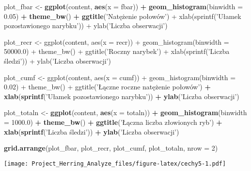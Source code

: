 \documentclass[]{article}
\newenvironment{Shaded}{\begin{snugshade}}{\end{snugshade}}
\newcommand{\DataTypeTok}[1]{\textcolor[rgb]{0.13,0.29,0.53}{#1}}
\newcommand{\DecValTok}[1]{\textcolor[rgb]{0.00,0.00,0.81}{#1}}
\newcommand{\FloatTok}[1]{\textcolor[rgb]{0.00,0.00,0.81}{#1}}
\newcommand{\KeywordTok}[1]{\textcolor[rgb]{0.13,0.29,0.53}{\textbf{#1}}}
\newcommand{\NormalTok}[1]{#1}
\newcommand{\OperatorTok}[1]{\textcolor[rgb]{0.81,0.36,0.00}{\textbf{#1}}}
\newcommand{\StringTok}[1]{\textcolor[rgb]{0.31,0.60,0.02}{#1}}
\begin{document}
\begin{Shaded}
\begin{Highlighting}[]
\NormalTok{plot_fbar <-}\StringTok{ }\KeywordTok{ggplot}\NormalTok{(content, }\KeywordTok{aes}\NormalTok{(}\DataTypeTok{x =}\NormalTok{ fbar)) }\OperatorTok{+}\StringTok{ }\KeywordTok{geom_histogram}\NormalTok{(}\DataTypeTok{binwidth =} \FloatTok{0.05}\NormalTok{) }\OperatorTok{+}
\StringTok{  }\KeywordTok{theme_bw}\NormalTok{() }\OperatorTok{+}\StringTok{ }\KeywordTok{ggtitle}\NormalTok{(}\StringTok{'Natężenie połowów') + }
\StringTok{  xlab(sprintf('}\NormalTok{Ułamek pozostawionego narybku}\StringTok{')) + ylab('}\NormalTok{Liczba obserwacji}\StringTok{')}

\StringTok{plot_recr <- ggplot(content, aes(x = recr)) + geom_histogram(binwidth = 50000.0) +}
\StringTok{  theme_bw() + ggtitle('}\NormalTok{Roczny narybek}\StringTok{') + }
\StringTok{  xlab(sprintf('}\NormalTok{Liczba śledzi}\StringTok{')) + ylab('}\NormalTok{Liczba obserwacji}\StringTok{')}

\StringTok{plot_cumf <- ggplot(content, aes(x = cumf)) + geom_histogram(binwidth = 0.02) +}
\StringTok{  theme_bw() + ggtitle('}\NormalTok{Łączne roczne natężenie połowów') }\OperatorTok{+}\StringTok{ }
\StringTok{  }\KeywordTok{xlab}\NormalTok{(}\KeywordTok{sprintf}\NormalTok{(}\StringTok{'Ułamek pozostawionego narybku'}\NormalTok{)) }\OperatorTok{+}\StringTok{ }\KeywordTok{ylab}\NormalTok{(}\StringTok{'Liczba obserwacji'}\NormalTok{)}

\NormalTok{plot_totaln <-}\StringTok{ }\KeywordTok{ggplot}\NormalTok{(content, }\KeywordTok{aes}\NormalTok{(}\DataTypeTok{x =}\NormalTok{ totaln)) }\OperatorTok{+}\StringTok{ }\KeywordTok{geom_histogram}\NormalTok{(}\DataTypeTok{binwidth =} \FloatTok{1000.0}\NormalTok{) }\OperatorTok{+}
\StringTok{  }\KeywordTok{theme_bw}\NormalTok{() }\OperatorTok{+}\StringTok{ }\KeywordTok{ggtitle}\NormalTok{(}\StringTok{'Łączna liczba złowionych ryb'}\NormalTok{) }\OperatorTok{+}\StringTok{ }
\StringTok{  }\KeywordTok{xlab}\NormalTok{(}\KeywordTok{sprintf}\NormalTok{(}\StringTok{'Liczba śledzi'}\NormalTok{)) }\OperatorTok{+}\StringTok{ }\KeywordTok{ylab}\NormalTok{(}\StringTok{'Liczba obserwacji'}\NormalTok{)}

\KeywordTok{grid.arrange}\NormalTok{(plot_fbar, plot_recr, plot_cumf, plot_totaln, }\DataTypeTok{nrow =} \DecValTok{2}\NormalTok{)}
\end{Highlighting}
\end{Shaded}

\texttt{[image: Project\_Herring\_Analyze\_files/figure-latex/cechy5-1.pdf]}
\end{document}
